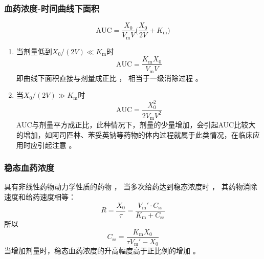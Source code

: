 \documentclass[dvipsnames, svgnames, x11names]{beamer}
\begin{document}
\begin{frame}
    \frametitle{血药浓度-时间曲线下面积}
    \[
        \mathrm{AUC}=\frac{X_{0}}{V_{\mathrm{m}}V}\biggl(\frac{X_{0}}{2V}+K_{\mathrm{m}}\biggr)
    \]
    \begin{enumerate}
      \item 当剂量低到$X_0/(2V)\ll K_{\mathrm{m}}$时
      \[
        \mathrm{AUC}=\frac{K_{\mathrm{m}}X_{0}}{V_{\mathrm{m}}V}
      \]
      即曲线下面积直接与剂量成正比 ， 相当于一级消除过程 。
      \item 当$X_0/(2V)\gg K_{\mathrm{m}}$时
      \[
        \mathrm{AUC}=\frac{X_{0}^2}{2V_{\mathrm{m}}V^2}
      \]
      AUC与剂量平方成正比，此种情况下，剂量的少量增加，会引起AUC比较大的增加，如阿司匹林、苯妥英钠等药物的体内过程就属于此类情况，在临床应用时应引起注意 。
    \end{enumerate}
\end{frame}


\begin{frame}
    \frametitle{稳态血药浓度}
    具有非线性药物动力学性质的药物 ， 当多次给药达到稳态浓度时 ， 其药物消除速度和给药速度相等：
    \[
        R = \frac{X_0}{\tau} = \frac{V_{\mathrm{m}}'\cdot C_\mathrm{ss}}{K_{\mathrm{m}}+C_\mathrm{ss}}
    \]
    所以
    \[
        C_\mathrm{ss} = \frac{K_{\mathrm{m}}X_0}{\tau V_{\mathrm{m}}' - X_0}
    \]
    当增加剂量时，稳态血药浓度的升高幅度高于正比例的增加 。
\end{frame}
\end{document}
